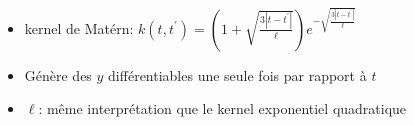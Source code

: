 \documentclass[xcolor=svgnames, t]{beamer}
\begin{document}
\begin{frame}{\subsecname}
  \begin{itemize}
    \item<1-> kernel de Matérn:
    $k (t, t^\prime) = ( 1 + \sqrt{\frac{3 |t - t^\prime|}{\ell} } ) e^{-\sqrt{\frac{3 |t - t^\prime|}{\ell} }}$
    \item<1-> Génère des $y$ différentiables une seule fois par rapport à $t$
    \item<1-> $\ell$: même interprétation que le kernel exponentiel quadratique
  \end{itemize}
  \begin{figure}
  \end{figure}
\end{frame}
\end{document}
